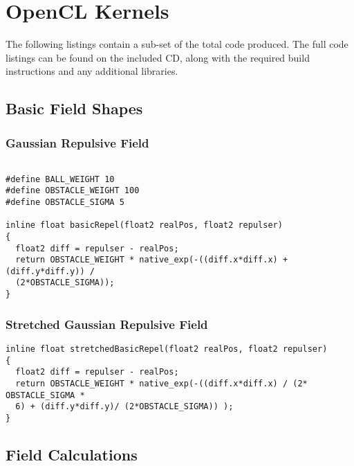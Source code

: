 \appendix


\section{OpenCL Kernels\label{sub:OpenCL-Kernels}}

The following listings contain a sub-set of the total code produced. The full
code listings can be found on the included CD, along with the required build
instructions and any additional libraries.

\subsection{Basic Field Shapes}


\subsubsection{Gaussian Repulsive Field\label{app:gaussianRepulsive}}

\begin{lstlisting}

#define BALL_WEIGHT 10
#define OBSTACLE_WEIGHT 100
#define OBSTACLE_SIGMA 5

inline float basicRepel(float2 realPos, float2 repulser)
{
  float2 diff = repulser - realPos;
  return OBSTACLE_WEIGHT * native_exp(-((diff.x*diff.x) + (diff.y*diff.y)) /
  (2*OBSTACLE_SIGMA)); 
}
\end{lstlisting}

\subsubsection{Stretched Gaussian Repulsive
Field\label{app:stretchedGaussianRepulsive}}

\begin{lstlisting}
inline float stretchedBasicRepel(float2 realPos, float2 repulser)
{
  float2 diff = repulser - realPos;
  return OBSTACLE_WEIGHT * native_exp(-((diff.x*diff.x) / (2* OBSTACLE_SIGMA *
  6) + (diff.y*diff.y)/ (2*OBSTACLE_SIGMA)) ); 
}
\end{lstlisting}

\subsection{Field Calculations}

